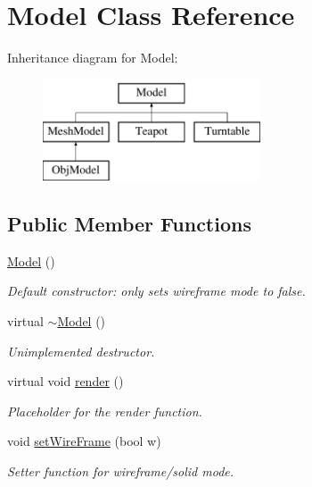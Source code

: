 \hypertarget{classModel}{\section{Model Class Reference}
\label{classModel}
}
Inheritance diagram for Model\-:\begin{figure}[H]
\begin{center}
\leavevmode
\includegraphics[height=3.000000cm]{classModel}
\end{center}
\end{figure}
\subsection*{Public Member Functions}
\begin{DoxyCompactItemize}
\item 
\hypertarget{classModel_ae3b375de5f6df4faf74a95d64748e048}{\hyperlink{classModel_ae3b375de5f6df4faf74a95d64748e048}{Model} ()}\label{classModel_ae3b375de5f6df4faf74a95d64748e048}

\begin{DoxyCompactList}\small\item\em Default constructor\-: only sets wireframe mode to false. \end{DoxyCompactList}\item 
\hypertarget{classModel_ad6ebd2062a0b823db841a0b88baac4c0}{virtual \hyperlink{classModel_ad6ebd2062a0b823db841a0b88baac4c0}{$\sim$\-Model} ()}\label{classModel_ad6ebd2062a0b823db841a0b88baac4c0}

\begin{DoxyCompactList}\small\item\em Unimplemented destructor. \end{DoxyCompactList}\item 
virtual void \hyperlink{classModel_a89ebd61864089abe5b0c5a1df6479970}{render} ()
\begin{DoxyCompactList}\small\item\em Placeholder for the render function. \end{DoxyCompactList}\item 
void \hyperlink{classModel_a9bbabfc8fba384132cac6a483bb31dd2}{set\-Wire\-Frame} (bool w)
\begin{DoxyCompactList}\small\item\em Setter function for wireframe/solid mode. \end{DoxyCompactList}\end{DoxyCompactItemize}


